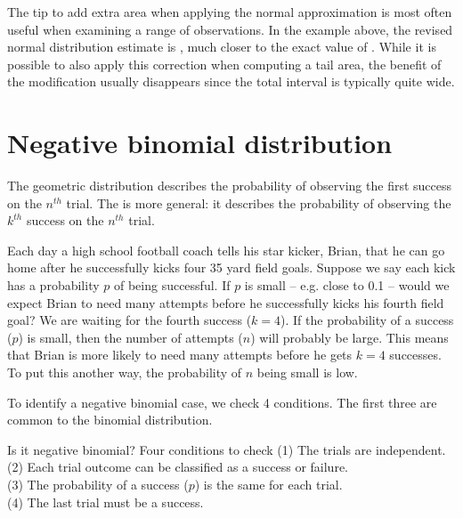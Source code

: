 The tip to add extra area when applying the normal
approximation is most often useful when examining
a range of observations.
In the example above, the revised normal distribution
estimate is \smokeABCNormalFixed{}, much closer to the
exact value of \smokeABCBinom{}.
While it is possible to also apply this correction when
computing a tail area, the benefit of the modification
usually disappears since the total interval is typically
quite wide.



{}




\section{Negative binomial distribution}
\label{negativeBinomial}


The geometric distribution describes the probability of observing the first success on the $n^{th}$ trial. The  is more general: it describes the probability of observing the $k^{th}$ success on the $n^{th}$ trial.

\begin{examplewrap}
\begin{nexample}{Each day a high school football coach tells his star kicker, Brian, that he can go home after he successfully kicks four 35 yard field goals. Suppose we say each kick has a probability $p$ of being successful. If $p$ is small -- e.g. close to 0.1 -- would we expect Brian to need many attempts before he successfully kicks his fourth field goal?}
We are waiting for the fourth success ($k=4$). If the probability of a success ($p$) is small, then the number of attempts ($n$) will probably be large. This means that Brian is more likely to need many attempts before he gets $k=4$ successes. To put this another way, the probability of $n$ being small is low.
\end{nexample}
\end{examplewrap}

To identify a negative binomial case, we check 4 conditions. The first three are common to the binomial distribution.

\begin{onebox}{Is it negative binomial? Four conditions to check}
(1) The trials are independent. \\
(2) Each trial outcome can be classified as a success or failure. \\
(3) The probability of a success ($p$) is the same for each trial. \\
(4) The last trial must be a success.
\end{onebox}

